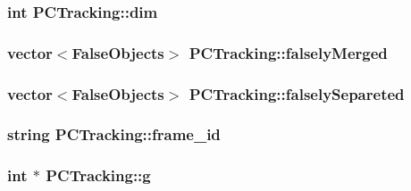 \hypertarget{class_p_c_tracking_a12b9e4818a5dbd1195ef8fa7d39c34b1}{
\subsubsection[{dim}]{\setlength{\rightskip}{0pt plus 5cm}int {\bf \-P\-C\-Tracking\-::dim}}}\label{class_p_c_tracking_a12b9e4818a5dbd1195ef8fa7d39c34b1}
\hypertarget{class_p_c_tracking_a54d6b67b92c09bc50250c108752c5401}{
\subsubsection[{falsely\-Merged}]{\setlength{\rightskip}{0pt plus 5cm}vector$<${\bf \-False\-Objects}$>$ {\bf \-P\-C\-Tracking\-::falsely\-Merged}}}\label{class_p_c_tracking_a54d6b67b92c09bc50250c108752c5401}
\hypertarget{class_p_c_tracking_a8ee53b44e5c3f9dfd4b33f6719487fa4}{
\subsubsection[{falsely\-Separeted}]{\setlength{\rightskip}{0pt plus 5cm}vector$<${\bf \-False\-Objects}$>$ {\bf \-P\-C\-Tracking\-::falsely\-Separeted}}}\label{class_p_c_tracking_a8ee53b44e5c3f9dfd4b33f6719487fa4}
\hypertarget{class_p_c_tracking_a62722fbba118f97283808d385c4f61d8}{
\subsubsection[{frame\-\_\-id}]{\setlength{\rightskip}{0pt plus 5cm}string {\bf \-P\-C\-Tracking\-::frame\-\_\-id}}}\label{class_p_c_tracking_a62722fbba118f97283808d385c4f61d8}
\hypertarget{class_p_c_tracking_aeb1f3746d39272933b70b6210298983f}{
\subsubsection[{g}]{\setlength{\rightskip}{0pt plus 5cm}int $\ast$ {\bf \-P\-C\-Tracking\-::g}}}\label{class_p_c_tracking_aeb1f3746d39272933b70b6210298983f}
